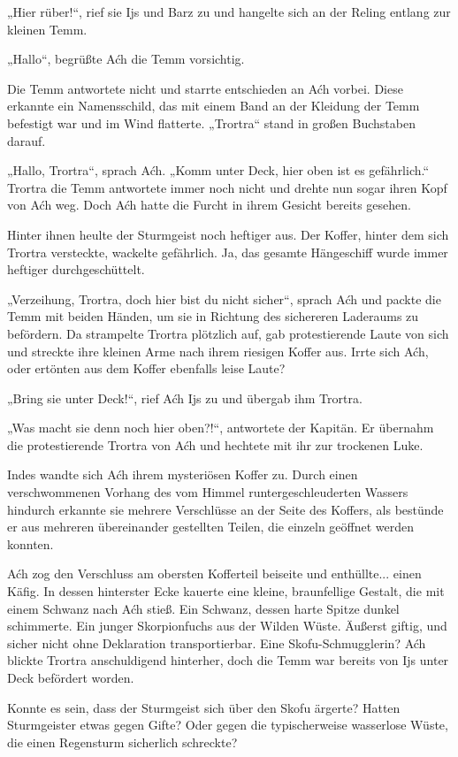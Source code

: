 „Hier rüber!“, rief sie Ijs und Barz zu und hangelte sich an der Reling entlang zur kleinen Temm.

„Hallo“, begrüßte Aćh die Temm vorsichtig.

Die Temm antwortete nicht und starrte entschieden an Aćh vorbei. Diese erkannte ein Namensschild, das mit einem Band an der Kleidung der Temm befestigt war und im Wind flatterte. „Trortra“ stand in großen Buchstaben darauf.

„Hallo, Trortra“, sprach Aćh. „Komm unter Deck, hier oben ist es gefährlich.“ Trortra die Temm antwortete immer noch nicht und drehte nun sogar ihren Kopf von Aćh weg. Doch Aćh hatte die Furcht in ihrem Gesicht bereits gesehen.

Hinter ihnen heulte der Sturmgeist noch heftiger aus. Der Koffer, hinter dem sich Trortra versteckte, wackelte gefährlich. Ja, das gesamte Hängeschiff wurde immer heftiger durchgeschüttelt.

„Verzeihung, Trortra, doch hier bist du nicht sicher“, sprach Aćh und packte die Temm mit beiden Händen, um sie in Richtung des sichereren Laderaums zu befördern. Da strampelte Trortra plötzlich auf, gab protestierende Laute von sich und streckte ihre kleinen Arme nach ihrem riesigen Koffer aus. Irrte sich Aćh, oder ertönten aus dem Koffer ebenfalls leise Laute?

„Bring sie unter Deck!“, rief Aćh Ijs zu und übergab ihm Trortra.

„Was macht sie denn noch hier oben?!“, antwortete der Kapitän. Er übernahm die protestierende Trortra von Aćh und hechtete mit ihr zur trockenen Luke.

Indes wandte sich Aćh ihrem mysteriösen Koffer zu. Durch einen verschwommenen Vorhang des vom Himmel runtergeschleuderten Wassers hindurch erkannte sie mehrere Verschlüsse an der Seite des Koffers, als bestünde er aus mehreren übereinander gestellten Teilen, die einzeln geöffnet werden konnten.

Aćh zog den Verschluss am obersten Kofferteil beiseite und enthüllte... einen Käfig. In dessen hinterster Ecke kauerte eine kleine, braunfellige Gestalt, die mit einem Schwanz nach Aćh stieß. Ein Schwanz, dessen harte Spitze dunkel schimmerte. Ein junger Skorpionfuchs aus der Wilden Wüste. Äußerst giftig, und sicher nicht ohne Deklaration transportierbar. Eine Skofu-Schmugglerin? Aćh blickte Trortra anschuldigend hinterher, doch die Temm war bereits von Ijs unter Deck befördert worden.

Konnte es sein, dass der Sturmgeist sich über den Skofu ärgerte? Hatten Sturmgeister etwas gegen Gifte? Oder gegen die typischerweise wasserlose Wüste, die einen Regensturm sicherlich schreckte?

